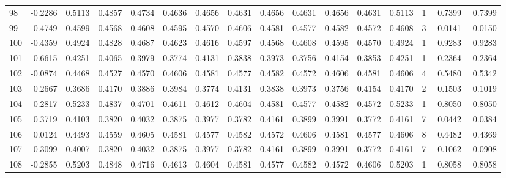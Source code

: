 \begin{tabular}{lrrrrrrrrrrrrrrr}
98  &     -0.2286 &  0.5113 &  0.4857 &  0.4734 &  0.4636 &  0.4656 &  0.4631 &  0.4656 &  0.4631 &  0.4656 &   0.4631 &     0.5113 &      1 &                    0.7399 &                     0.7399 \\
99  &      0.4749 &  0.4599 &  0.4568 &  0.4608 &  0.4595 &  0.4570 &  0.4606 &  0.4581 &  0.4577 &  0.4582 &   0.4572 &     0.4608 &      3 &                   -0.0141 &                    -0.0150 \\
100 &     -0.4359 &  0.4924 &  0.4828 &  0.4687 &  0.4623 &  0.4616 &  0.4597 &  0.4568 &  0.4608 &  0.4595 &   0.4570 &     0.4924 &      1 &                    0.9283 &                     0.9283 \\
101 &      0.6615 &  0.4251 &  0.4065 &  0.3979 &  0.3774 &  0.4131 &  0.3838 &  0.3973 &  0.3756 &  0.4154 &   0.3853 &     0.4251 &      1 &                   -0.2364 &                    -0.2364 \\
102 &     -0.0874 &  0.4468 &  0.4527 &  0.4570 &  0.4606 &  0.4581 &  0.4577 &  0.4582 &  0.4572 &  0.4606 &   0.4581 &     0.4606 &      4 &                    0.5480 &                     0.5342 \\
103 &      0.2667 &  0.3686 &  0.4170 &  0.3886 &  0.3984 &  0.3774 &  0.4131 &  0.3838 &  0.3973 &  0.3756 &   0.4154 &     0.4170 &      2 &                    0.1503 &                     0.1019 \\
104 &     -0.2817 &  0.5233 &  0.4837 &  0.4701 &  0.4611 &  0.4612 &  0.4604 &  0.4581 &  0.4577 &  0.4582 &   0.4572 &     0.5233 &      1 &                    0.8050 &                     0.8050 \\
105 &      0.3719 &  0.4103 &  0.3820 &  0.4032 &  0.3875 &  0.3977 &  0.3782 &  0.4161 &  0.3899 &  0.3991 &   0.3772 &     0.4161 &      7 &                    0.0442 &                     0.0384 \\
106 &      0.0124 &  0.4493 &  0.4559 &  0.4605 &  0.4581 &  0.4577 &  0.4582 &  0.4572 &  0.4606 &  0.4581 &   0.4577 &     0.4606 &      8 &                    0.4482 &                     0.4369 \\
107 &      0.3099 &  0.4007 &  0.3820 &  0.4032 &  0.3875 &  0.3977 &  0.3782 &  0.4161 &  0.3899 &  0.3991 &   0.3772 &     0.4161 &      7 &                    0.1062 &                     0.0908 \\
108 &     -0.2855 &  0.5203 &  0.4848 &  0.4716 &  0.4613 &  0.4604 &  0.4581 &  0.4577 &  0.4582 &  0.4572 &   0.4606 &     0.5203 &      1 &                    0.8058 &                     0.8058 \\

\end{tabular}
